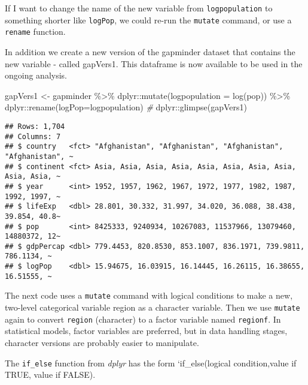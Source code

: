 \documentclass[
]{book}
\newenvironment{Shaded}{\begin{snugshade}}{\end{snugshade}}
\newcommand{\AttributeTok}[1]{\textcolor[rgb]{0.77,0.63,0.00}{#1}}
\newcommand{\CommentTok}[1]{\textcolor[rgb]{0.56,0.35,0.01}{\textit{#1}}}
\newcommand{\FunctionTok}[1]{\textcolor[rgb]{0.00,0.00,0.00}{#1}}
\newcommand{\NormalTok}[1]{#1}
\newcommand{\OtherTok}[1]{\textcolor[rgb]{0.56,0.35,0.01}{#1}}
\newcommand{\SpecialCharTok}[1]{\textcolor[rgb]{0.00,0.00,0.00}{#1}}
\begin{document}
If I want to change the name of the new variable from \texttt{logpopulation} to something shorter like \texttt{logPop}, we could re-run the \texttt{mutate} command, or use a \texttt{rename} function.

In addition we create a new version of the gapminder dataset that contains the new variable - called gapVers1. This dataframe is now available to be used in
the ongoing analysis.

\begin{Shaded}
\begin{Highlighting}[]
\NormalTok{gapVers1 }\OtherTok{\textless{}{-}}\NormalTok{ gapminder }\SpecialCharTok{\%\textgreater{}\%}
\NormalTok{  dplyr}\SpecialCharTok{::}\FunctionTok{mutate}\NormalTok{(}\AttributeTok{logpopulation =} \FunctionTok{log}\NormalTok{(pop)) }\SpecialCharTok{\%\textgreater{}\%}
\NormalTok{  dplyr}\SpecialCharTok{::}\FunctionTok{rename}\NormalTok{(}\AttributeTok{logPop=}\NormalTok{logpopulation) }
\CommentTok{\#}
\NormalTok{  dplyr}\SpecialCharTok{::}\FunctionTok{glimpse}\NormalTok{(gapVers1)}
\end{Highlighting}
\end{Shaded}

\begin{verbatim}
## Rows: 1,704
## Columns: 7
## $ country   <fct> "Afghanistan", "Afghanistan", "Afghanistan", "Afghanistan", ~
## $ continent <fct> Asia, Asia, Asia, Asia, Asia, Asia, Asia, Asia, Asia, Asia, ~
## $ year      <int> 1952, 1957, 1962, 1967, 1972, 1977, 1982, 1987, 1992, 1997, ~
## $ lifeExp   <dbl> 28.801, 30.332, 31.997, 34.020, 36.088, 38.438, 39.854, 40.8~
## $ pop       <int> 8425333, 9240934, 10267083, 11537966, 13079460, 14880372, 12~
## $ gdpPercap <dbl> 779.4453, 820.8530, 853.1007, 836.1971, 739.9811, 786.1134, ~
## $ logPop    <dbl> 15.94675, 16.03915, 16.14445, 16.26115, 16.38655, 16.51555, ~
\end{verbatim}

The next code uses a \texttt{mutate} command with logical conditions to make a new, two-level categorical variable region as a character variable. Then we use \texttt{mutate} again to convert \texttt{region} (character) to a factor variable named \texttt{regionf}. In statistical models, factor variables are preferred, but in data handling stages, character versions are probably easier to manipulate.

The \texttt{if\_else} function from \emph{dplyr} has the form `if\_else(logical condition,value if TRUE, value if FALSE).
\end{document}
